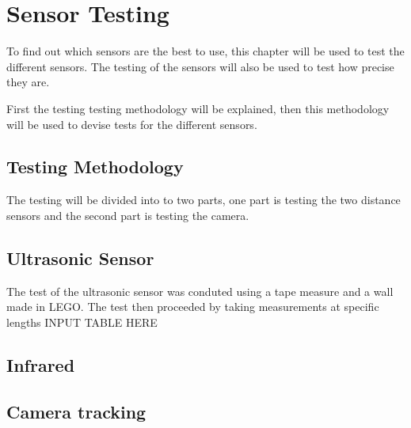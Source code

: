 \section{Sensor Testing}
To find out which sensors are the best to use, this chapter will be used to test
the different sensors. The testing of the sensors will also be used to test how
precise they are.\nl

First the testing testing methodology will be explained, then this methodology
will be used to devise tests for the different sensors. 

\subsection{Testing Methodology}
The testing will be divided into to two parts, one part is testing the two
distance sensors and the second part is testing the camera. 

\subsection{Ultrasonic Sensor}
The test of the ultrasonic sensor was conduted using a tape measure and a wall
made in LEGO. The test then proceeded by taking measurements at specific
lengths 
{INPUT TABLE HERE}

\subsection{Infrared}

\subsection{Camera tracking}%